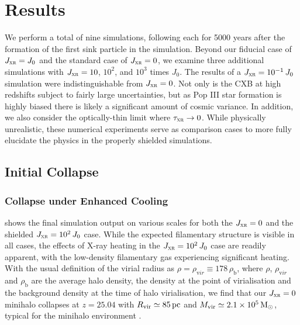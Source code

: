 \documentclass[../thesis.tex]{subfiles}
\begin{document}
\section{Results}
\label{xr_results}
We perform a total of nine simulations, following each for 5000 years after the formation of the first sink particle in the simulation.  Beyond our fiducial case of $J_{\textsc{xr}}=J_0$ and the standard case of $J_{\textsc{xr}}=0$, we examine three additional  simulations with $J_{\textsc{xr}} = 10$, $10^2$, and $10^3$ times $J_0$. The results of a $J_{\textsc{xr}} = 10^{-1}\,J_0$ simulation were indistinguishable from $J_{\textsc{xr}}=0$. Not only is the CXB at high redshifts subject to fairly large uncertainties, but as Pop III star formation is highly biased there is likely a significant amount of cosmic variance.
In addition, we also consider the optically-thin limit where $\tau_{\textsc{xr}} \rightarrow 0$.  While physically unrealistic, these numerical experiments serve as comparison cases to more fully elucidate the physics in the properly shielded simulations.

\subsection{Initial Collapse}
\label{collapse}
\subsubsection{Collapse under Enhanced Cooling}
\label{collapse_acceleration}
 shows the final simulation output on various scales for both the $J_{\textsc{xr}}=0$ and the shielded $J_{\textsc{xr}} = 10^2\,J_0$ case.  While the expected filamentary structure is visible in all cases, the effects of X-ray heating in the  $J_{\textsc{xr}} = 10^2\,J_0$ case are readily apparent, with the low-density filamentary gas  
experiencing significant heating. With the usual definition of the virial radius \rvir as $\rho = \rho_{\mathrm vir} \equiv 178\,\rho_{\mathrm b}$, where $\rho$, $\rho_{\mathrm vir}$ and $\rho_{\mathrm b}$ are the average halo density, the density at the point of virialisation and the background density at the time of halo virialisation, we find that our $J_{\textsc{xr}} = 0$ minihalo collapses at $z=25.04$ with ${R}_{\mathrm{vir}} \simeq 85\,\mathrm{pc}$ and ${M}_{\mathrm{vir}} \simeq 2.1\times10^5\,\mathrm{M}_{\odot}$, typical for the minihalo environment \citep{Bromm2013}.  
\end{document}
